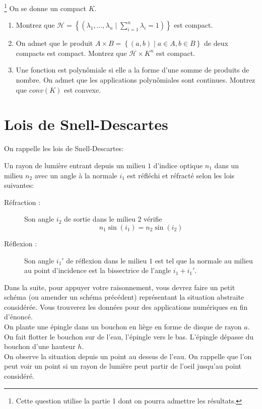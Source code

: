 \documentclass{cours}
\begin{document}
\begin{question}\footnote{Cette question utilise la partie 1 dont on pourra admettre les résultats.}
    On se donne un compact $K$.
    \begin{enumerate}
        \item Montrez que $\mathcal{H} = \left\{\left(\lambda_{1}, \ldots, \lambda_{n} \mid \sum_{i = 1}^{n}\lambda_{i} = 1\right)\right\}$ est compact.
        \item On admet que le produit $A \times B = \left\{(a, b) \mid a \in A, b \in B\right\}$ de deux compacts est compact. Montrez que $\mathcal{H} \times K^{n}$ est compact.
        \item Une fonction est polynômiale si elle a la forme d'une somme de produits de nombre. On admet que les applications polynômiales sont continues. Montrez que $conv(K)$ est convexe.
    \end{enumerate}
\end{question}

\section{Lois de Snell-Descartes}
On rappelle les lois de Snell-Descartes:
    
        Un rayon de lumière entrant depuis un milieu $1$ d'indice optique $n_{1}$ dans un milieu $n_{2}$ avec un angle à la normale $i_{1}$ est réfléchi et réfracté selon les lois suivantes:
        \begin{description}
            \item[Réfraction :] Son angle $i_{2}$ de sortie dans le milieu $2$ vérifie \[n_{1}\sin{\left(i_{1}\right)} = n_{2}\sin{\left(i_{2}\right)}\]
            \item[Réflexion :]  Son angle $i_{1}'$ de réflexion dans le milieu $1$ est tel que la normale au milieu au point d'incidence est la bissectrice de l'angle $i_{1} + i_{1}'$.
        \end{description}
    
Dans la suite, pour appuyer votre raisonnement, vous devrez faire un petit schéma (ou amender un schéma précédent) représentant la situation abstraite considérée. Vous trouverez les données pour des applications numériques en fin d'énoncé.\\

On plante une épingle dans un bouchon en liège en forme de disque de rayon $a$. On fait flotter le bouchon sur de l'eau, l'épingle vers le bas. L'épingle dépasse du bouchon d'une hauteur $h$.\\
On observe la situation depuis un point au dessus de l'eau. On rappelle que l'on peut voir un point si un rayon de lumière peut partir de l'oeil jusqu'au point considéré.
\end{document}
